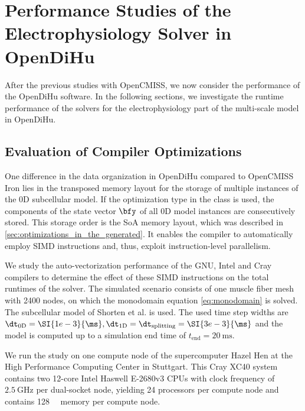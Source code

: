 


\section{Performance Studies of the Electrophysiology Solver in OpenDiHu}\label{sec:performance_studies_of_the_e}
After the previous studies with OpenCMISS, we now consider the performance of the OpenDiHu software.
In the following sections, we investigate the runtime performance of the solvers for the electrophysiology part of the multi-scale model in OpenDiHu.

\subsection{Evaluation of Compiler Optimizations}

One difference in the data organization in OpenDiHu compared to OpenCMISS Iron lies in the transposed memory layout for the storage of multiple instances of the 0D subcellular model. If the  optimization type in the  class is used, the components of the state vector $\bfy$ of all 0D model instances are consecutively stored. This storage order is the SoA memory layout, which was described in \cref{sec:optimizations_in_the_generated}. It enables the compiler to automatically employ SIMD instructions and, thus, exploit instruction-level parallelism.

We study the auto-vectorization performance of the GNU, Intel and Cray compilers to determine the effect of these SIMD instructions on the total runtimes of the solver. The simulated scenario consists of one muscle fiber mesh with 2400 nodes, on which the monodomain equation \cref{eq:monodomain} is solved. The subcellular model of Shorten et al. \cite{Shorten2007} is used. The used time step widths are $\dt_\text{0D} = \SI{1e-3}{\ms}, \dt_\text{1D} = \dt_\text{splitting} = \SI{3e-3}{\ms}$ and the model is computed up to a simulation end time of $t_\text{end} = \SI{20}{\ms}$.

We run the study on one compute node of the supercomputer Hazel Hen at the High Performance Computing Center in Stuttgart. This Cray XC40 system contains two 12-core Intel Haswell E-2680v3 CPUs with clock frequency of $\SI{2.5}{\giga\hertz}$ per dual-socket node, yielding 24 processors per compute node and contains \SI{128}{\giga\byte} memory per compute node.

